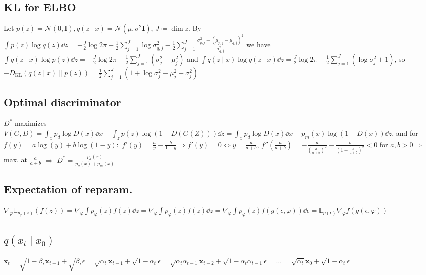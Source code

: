 \documentclass[11pt,landscape,a4paper,fleqn]{article}
\newcommand{\kl}[2]{D_{\mathrm{KL}}(#1\lVert#2)}
\newcommand{\E}{\mathbb{E}}
\def\myvector#1{\mathbf{#1}}
\def\vx{{\myvector{x}}}
\def\mymatrix#1{\mathbf{#1}}
\def\mI{{\mymatrix{I}}}
\begin{document}
\begin{multicols*}{4}
\subsection*{KL for ELBO} Let $p(z) = \mathcal{N}(0, \mI), q(z\mid x) = \mathcal{N}(\mu, \sigma^2 \mI)$, $J \coloneqq \dim z$.
By $\int p(z) \log q(z) \dd z = - \frac{J}{2} \log 2\pi - \frac{1}{2} \sum_{j = 1}^J \log\sigma^2_{q, j}
- \frac{1}{2} \sum_{j = 1}^J \frac{\sigma_{p, j}^2 + (\mu_{p, j} - \mu_{q, j})^2}{\sigma^2_{q, j}}$
we have $\int q(z\mid x) \log p(z) \dd z = - \frac{J}{2} \log 2\pi - \frac{1}{2} \sum_{j = 1}^J(\sigma_j^2 + \mu_j^2)$
and $\int q(z\mid x) \log q(z\mid x) \dd z = \frac{J}{2} \log 2\pi - \frac{1}{2} \sum_{j = 1}^J(\log \sigma_j^2 + 1)$,
so $ - \kl{q(z\mid x)}{p(z)} = \frac{1}{2} \sum_{j = 1}^J (1 + \log \sigma_j^2 - \mu_j^2 - \sigma_j^2)$

\subsection*{Optimal discriminator} $D^*$ maximizes $V(G, D) = \int_x p_d \log D(x) \dd x + \int_z p(z) \log(1 - D(G(Z))) \dd z
= \int_x p_d \log D(x) \dd x + p_m(x) \log(1 - D(x)) \dd z$,
and for $f(y) = a\log(y) + b\log(1 - y):$
$f'(y) = \frac{a}{y} - \frac{b}{1 - y} \Rightarrow f'(y) = 0 \Leftrightarrow y = \frac{a}{a + b}$,
$f''(\frac{a}{a + b}) = - \frac{a}{\left(\frac{a}{a + b}\right)^2} - \frac{b}{\left(1 - \frac{a}{a + b}\right)^2} < 0$
for $a, b > 0 \Rightarrow $ max. at $\frac{a}{a + b}$ $\Rightarrow$ $D^* = \frac{p_d(x)}{p_d(x) + p_m(x)}$

\subsection*{Expectation of reparam.}

\!\!$\nabla_\varphi \E_{p_\varphi(z)}(f(z)) = \nabla_\varphi \int p_\varphi(z) f(z) \dd z
= \nabla_\varphi\! \int\!\! p_\varphi(z) f(z) \dd z \!=\! \nabla_\varphi\! \int\!\! p_\varphi(z) f(g(\epsilon, \varphi)) \dd \epsilon
\!=\! \E_{p(\epsilon)}\! \nabla_\varphi f(g(\epsilon, \varphi))$

\subsection*{$q(x_t \mid x_0)$}
$\vx_t = \sqrt{1 - \beta_t} \vx_{t-1} + \sqrt{\beta_t} \epsilon
= \sqrt{\alpha_t} \vx_{t-1} + \sqrt{1 - \alpha_t} \epsilon
= \sqrt{\alpha_t \alpha_{t - 1}} \vx_{t-2} + \sqrt{1 - \alpha_t \alpha_{t - 1}} \epsilon
= \dots = \sqrt{\overline{\alpha}_t} \vx_0 + \sqrt{1 - \overline{\alpha}_t} \epsilon$



\end{multicols*}
\end{document}
